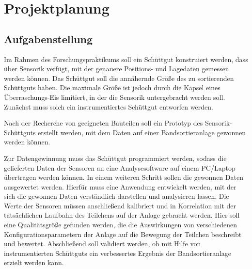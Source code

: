 \section{Projektplanung}

\subsection{Aufgabenstellung}

Im Rahmen des Forschungspraktikums soll ein Schüttgut konstruiert werden, dass über Sensorik verfügt, mit der genauere Positions- und Lagedaten gemessen werden können. Das Schüttgut soll die annähernde Größe des zu sortierenden Schüttguts haben. Die maximale Größe ist jedoch durch die Kapsel eines Überraschungs-Eis limitiert, in der die Sensorik untergebracht werden soll. Zunächst muss solch ein instrumentiertes Schüttgut entworfen werden.
 
Nach der Recherche von geeigneten Bauteilen soll ein Prototyp des Sensorik-Schüttguts erstellt werden, mit dem Daten auf einer Bandsortieranlage gewonnen werden können.

Zur Datengewinnung muss das Schüttgut programmiert werden, sodass die gelieferten Daten der Sensoren an eine Analysesoftware auf einem  PC/Laptop übertragen werden können. In einem weiteren Schritt sollen die gewonnen Daten ausgewertet werden. Hierfür muss eine Anwendung entwickelt werden, mit der sich die gewonnen Daten verständlich darstellen und analysieren lassen.
Die Werte der Sensoren müssen anschließend kalibriert und in Korrelation mit der tatsächlichen Laufbahn des Teilchens auf der Anlage gebracht werden. Hier soll eine Qualitätsgröße gefunden werden, die die Auswirkungen von verschiedenen Konfigurationsparametern der Anlage auf die Bewegung der Teilchen beschreibt und bewertet. 
Abschließend soll validiert werden, ob mit Hilfe von instrumentierten Schüttguts ein verbessertes Ergebnis der Bandsortieranlage erzielt werden kann.

